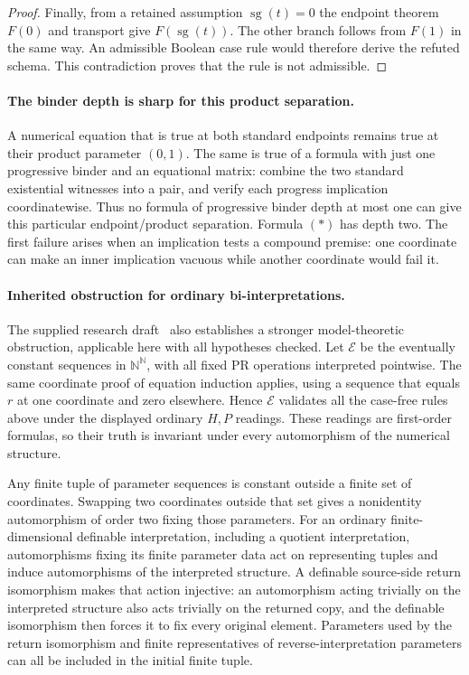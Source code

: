 \begin{proof}
Finally, from a retained assumption $\operatorname{sg}(t)=0$ the
endpoint theorem $F(0)$ and transport give $F(\operatorname{sg}(t))$.
The other branch follows from $F(1)$ in the same way. An admissible
Boolean case rule would therefore derive the refuted schema. This
contradiction proves that the rule is not admissible.
\end{proof}

\paragraph{The binder depth is sharp for this product separation.}
A numerical equation that is true at both standard endpoints remains
true at their product parameter $(0,1)$. The same is true of a formula
with just one progressive binder and an equational matrix: combine
the two standard existential witnesses into a pair, and verify each
progress implication coordinatewise. Thus no formula of progressive
binder depth at most one can give this particular endpoint/product
separation. Formula $(*)$ has depth two. The first failure arises when
an implication tests a compound premise: one coordinate can make an
inner implication vacuous while another coordinate would fail it.

\paragraph{Inherited obstruction for ordinary bi-interpretations.}
The supplied research draft~\cite{research} also establishes a stronger model-theoretic
obstruction, applicable here with all hypotheses checked. Let
$\mathcal E$ be the eventually constant sequences in $\mathbb N^{\mathbb N}$,
with all fixed PR operations interpreted pointwise. The same coordinate
proof of equation induction applies, using a sequence that equals $r$ at
one coordinate and zero elsewhere. Hence $\mathcal E$ validates all the
case-free rules above under the displayed ordinary $H,P$ readings.
These readings are first-order formulas, so their truth is invariant
under every automorphism of the numerical structure.

Any finite tuple of parameter sequences is constant outside a finite
set of coordinates. Swapping two coordinates outside that set gives a
nonidentity automorphism of order two fixing those parameters. For an
ordinary finite-dimensional definable interpretation, including a
quotient interpretation, automorphisms fixing its finite parameter data
act on representing tuples and induce automorphisms of the interpreted
structure. A definable source-side return isomorphism makes that action
injective: an automorphism acting trivially on the interpreted structure
also acts trivially on the returned copy, and the definable isomorphism
then forces it to fix every original element. Parameters used by the
return isomorphism and finite representatives of reverse-interpretation
parameters can all be included in the initial finite tuple.

